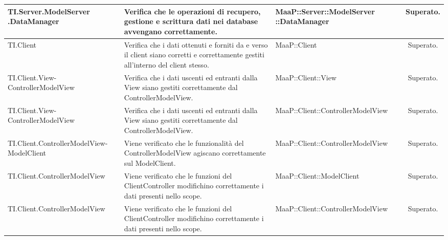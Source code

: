 \begin{center}
\begin{longtable}{|p{4.5cm}|p{3cm}|p{5.5cm}|c|}
\midrule
TI.Server.ModelServer .DataManager
& Verifica che le operazioni di recupero, gestione e scrittura dati nei database avvengano correttamente.
& MaaP::Server::ModelServer ::DataManager
& Superato.\\


\midrule
TI.Client
& Verifica che i dati ottenuti e forniti da e verso il client siano corretti e correttamente gestiti all'interno del client stesso.
& MaaP::Client
& Superato.\\


\midrule
TI.Client.View-ControllerModelView
& Verifica che i dati uscenti ed entranti dalla View siano gestiti correttamente dal ControllerModelView.
& MaaP::Client::View
& Superato.\\


\midrule
TI.Client.View-ControllerModelView
& Verifica che i dati uscenti ed entranti dalla View siano gestiti correttamente dal ControllerModelView.
& MaaP::Client::ControllerModelView
& Superato.\\


\midrule
TI.Client.ControllerModelView-ModelClient
& Viene verificato che le funzionalità del ControllerModelView agiscano correttamente sul ModelClient.
& MaaP::Client::ControllerModelView
& Superato.\\


\midrule
TI.Client.ControllerModelView
& Viene verificato che le funzioni del ClientController modifichino correttamente i dati presenti nello scope.
& MaaP::Client::ModelClient
& Superato.\\


\midrule
TI.Client.ControllerModelView
& Viene verificato che le funzioni del ClientController modifichino correttamente i dati presenti nello scope.
& MaaP::Client::ControllerModelView
& Superato.\\


\end{longtable}
\end{center}


